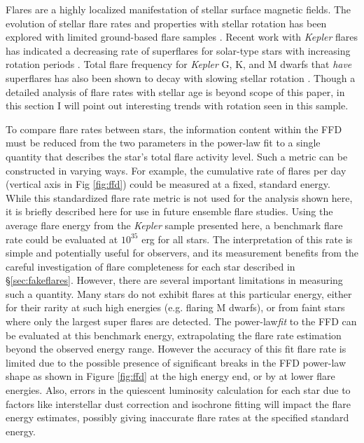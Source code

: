 \documentclass[twocolumn]{aastex6}
\newcommand{\Kepler}{\textsl{Kepler}\xspace}
\begin{document}
Flares are a highly localized manifestation of stellar surface magnetic fields. The evolution of stellar flare rates and properties with stellar rotation has been explored with limited ground-based flare samples \citep{skumanich1986}. Recent work with \Kepler flares has indicated a decreasing rate of superflares for solar-type stars with increasing rotation periods \citep{maehara2015}. Total flare frequency for \Kepler G, K, and M dwarfs that {\it have} superflares has also been shown to decay with slowing stellar rotation \citep{candelaresi2014}. 
Though a detailed analysis of flare rates with stellar age is beyond scope of this paper, in this section I will point out interesting trends with rotation seen in this sample.


To compare flare rates between stars, the information content within the FFD must be reduced from the two parameters in the power-law fit to a single quantity that describes the star's total flare activity level. Such a metric can be constructed in varying ways. For example, the cumulative rate of flares per day (vertical axis in Fig \ref{fig:ffd}) could be measured at a fixed, standard energy.  While this standardized flare rate metric is not used for the analysis shown here, it is briefly described here for use in future ensemble flare studies. 
Using the average flare energy from the \Kepler sample presented here, a benchmark flare rate could be evaluated at $10^{35}$ erg for all stars. The interpretation of this rate is simple and potentially useful for observers, and its measurement benefits from the careful investigation of flare completeness for each star described in \S\ref{sec:fakeflares}.
However, there are several important limitations in measuring such a quantity. Many stars do not exhibit flares at this particular energy, either for their rarity at such high energies (e.g. flaring M dwarfs), or from faint stars where only the largest super flares are detected. The power-law{\it fit} to the FFD can be evaluated at this benchmark energy, extrapolating the flare rate estimation beyond the observed energy range. However the accuracy of this fit flare rate is limited due to the possible presence of significant breaks in the FFD power-law shape as shown in Figure \ref{fig:ffd} at the high energy end, or by \citet{hawley2014} at lower flare energies. Also, errors in the quiescent luminosity calculation for each star due to factors like interstellar dust correction and isochrone fitting will impact the flare energy estimates, possibly giving inaccurate flare rates at the specified standard energy.
\end{document}
